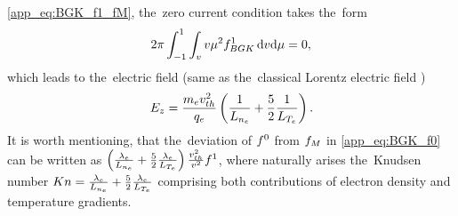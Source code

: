 \eqref{app_eq:BGK_f1_fM}, the~zero current condition takes the~form
\begin{equation}
  2\pi\int_{-1}^{1} \int_{v} v \mu^2 f^1_{BGK}\, \text{d}v\text{d}\mu = 0 ,
  \nonumber
\end{equation}
which leads to the~electric field (same as the~classical Lorentz electric field
\cite{Lorentz_1905})
\begin{equation}
  E_z = \frac{m_ev_{th}^2}{q_e}\left(\frac{1}{L_{n_e}} 
  + \frac{5}{2}\frac{1}{L_{T_e}} \right) .
  \label{app_eq:BGK_Efield}
\end{equation}
It is worth mentioning, that the~deviation of $f^0$ from $f_M$ in 
\eqref{app_eq:BGK_f0} can be written as $\left(\frac{\lambda_e}{L_{n_e}} 
  + \frac{5}{2}\frac{\lambda_e}{L_{T_e}} \right)\frac{v_{th}^2}{v^2}f^1$,
where naturally arises the~Knudsen number 
$Kn = \frac{\lambda_e}{L_{n_e}} + \frac{5}{2}\frac{\lambda_e}{L_{T_e}}$ comprising
both contributions of electron density and temperature gradients.

